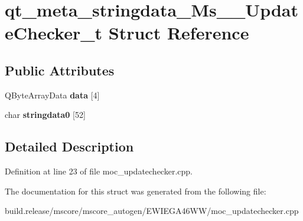 \hypertarget{structqt__meta__stringdata___ms_____update_checker__t}{}\section{qt\+\_\+meta\+\_\+stringdata\+\_\+\+Ms\+\_\+\+\_\+\+Update\+Checker\+\_\+t Struct Reference}
\label{structqt__meta__stringdata___ms_____update_checker__t}
\subsection*{Public Attributes}
\begin{DoxyCompactItemize}
\item 
\mbox{\label{structqt__meta__stringdata___ms_____update_checker__t_ac4541f4c7a8bd36c78c1a8e4957149f5}} 
Q\+Byte\+Array\+Data {\bfseries data} \mbox{[}4\mbox{]}
\item 
\mbox{\label{structqt__meta__stringdata___ms_____update_checker__t_aa2dbff236e7b4ec1b25d0f5c200990b8}} 
char {\bfseries stringdata0} \mbox{[}52\mbox{]}
\end{DoxyCompactItemize}


\subsection{Detailed Description}


Definition at line 23 of file moc\+\_\+updatechecker.\+cpp.



The documentation for this struct was generated from the following file\+:\begin{DoxyCompactItemize}
\item 
build.\+release/mscore/mscore\+\_\+autogen/\+E\+W\+I\+E\+G\+A46\+W\+W/moc\+\_\+updatechecker.\+cpp\end{DoxyCompactItemize}
